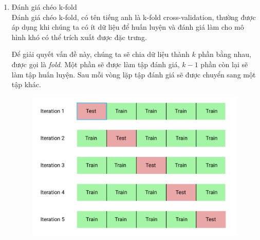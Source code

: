 \begin{enumerate}
\item Đánh giá chéo k-fold\\
Đánh giá chéo k-fold, có tên tiếng anh là k-fold cross-validation, thường được áp dụng khi chúng ta có ít dữ liệu để huấn luyện và đánh giá làm cho mô hình khó có thể trích xuất được đặc trưng. \par 
Để giải quyết vấn đề này, chúng ta sẽ chia dữ liệu thành $k$ phần bằng nhau, được gọi là \textit{fold}. Một phần sẽ được làm tập đánh giá, $k-1$ phần còn lại sẽ làm tập huấn luyện. Sau mỗi vòng lặp tập đánh giá sẽ được chuyển sang một tập khác.
\begin{figure}[H]
\begin{center}
\includegraphics[scale=0.5]{chap3/image/kfold.png}

\end{center}
\end{figure}
\end{enumerate}
